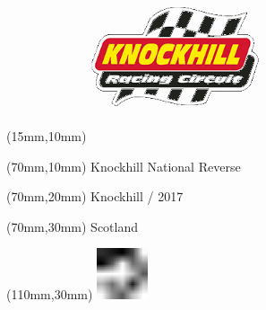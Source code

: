 \null\newpage
\begin{textblock*}{50mm}(15mm,10mm)%
\includegraphics[width=50mm]{LG/KNO.png}
\end{textblock*}
\begin{textblock*}{130mm}(70mm,10mm)%
{\fontsize{20}{20}\selectfont Knockhill National Reverse}\\
\end{textblock*}
\begin{textblock*}{120mm}(70mm,20mm)%
{\fontsize{16}{16}\selectfont Knockhill / 2017}\\
\end{textblock*}
\begin{textblock*}{120mm}(70mm,30mm)%
{\fontsize{12}{12}\selectfont Scotland}
\end{textblock*}
\begin{textblock*}{30mm}(110mm,30mm)%
\centering
\includegraphics[height=15mm]{icons/fa-rotate-left.pdf}
\end{textblock*}
